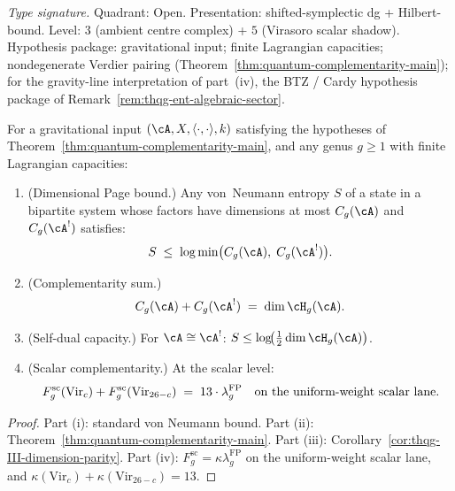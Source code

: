 \begin{theorem}
\label{thm:thqg-page-constraint}
\textit{Type signature.}
Quadrant: Open. Presentation: shifted-symplectic dg + Hilbert-bound.
Level: $3$ (ambient centre complex) + $5$ (Virasoro scalar shadow).
Hypothesis package: gravitational input; finite Lagrangian capacities;
nondegenerate Verdier pairing
\textup{(}Theorem~\ref{thm:quantum-complementarity-main}\textup{)};
for the gravity-line interpretation of part~\textup{(iv)}, the
BTZ / Cardy hypothesis package of
Remark~\ref{rem:thqg-ent-algebraic-sector}.

\medskip
For a gravitational input $(\cA, X, \langle \cdot, \cdot \rangle, k)$
satisfying the hypotheses of
Theorem~\ref{thm:quantum-complementarity-main}, and any genus
$g \ge 1$ with finite Lagrangian capacities:
\begin{enumerate}[label=\textup{(\roman*)}]
\item \textup{(Dimensional Page bound.)}
 Any von~Neumann entropy $S$ of a state in a bipartite system
 whose factors have dimensions at most $C_g(\cA)$ and $C_g(\cA^!)$
 satisfies:
 \begin{equation}\label{eq:thqg-page-bound}
 S
 \;\le\;
 \log\min\bigl(C_g(\cA),\; C_g(\cA^!)\bigr).
 \end{equation}

\item \textup{(Complementarity sum.)}
 \begin{equation}\label{eq:thqg-page-complementarity}
 C_g(\cA) + C_g(\cA^!)
 \;=\;
 \dim \cH_g(\cA).
 \end{equation}

\item \textup{(Self-dual capacity.)}
 For $\cA \cong \cA^!$:
 $S \le \log\!\bigl(\tfrac{1}{2}\dim \cH_g(\cA)\bigr)$.

\item \textup{(Scalar complementarity.)}
 At the scalar level:
 \begin{equation}\label{eq:thqg-page-virasoro-scalar}
 F_g^{\mathrm{sc}}(\mathrm{Vir}_c)
 + F_g^{\mathrm{sc}}(\mathrm{Vir}_{26-c})
 \;=\;
 13 \cdot \lambda_g^{\mathrm{FP}}
 \quad\textup{on the uniform-weight scalar lane}.
 \end{equation}
\end{enumerate}
\end{theorem}

\begin{proof}
Part (i): standard von Neumann bound.
Part (ii): Theorem~\ref{thm:quantum-complementarity-main}.
Part (iii): Corollary~\ref{cor:thqg-III-dimension-parity}.
Part (iv): $F_g^{\mathrm{sc}}=\kappa\lambda_g^{\mathrm{FP}}$ on the
uniform-weight scalar lane, and
$\kappa(\mathrm{Vir}_c) + \kappa(\mathrm{Vir}_{26-c}) = 13$.
\end{proof}

